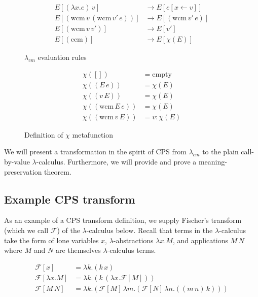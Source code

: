 \documentclass[11pt,ms]{byuprop}
\newcounter{definition}
\newcounter{example}
\begin{document}
\begin{figure}
\begin{align*}
E[(\lambda x.e)\,v]                         &\rightarrow E[e[x\leftarrow v]]\\
E[(\mathrm{wcm}\,v\,(\mathrm{wcm}\,v'\,e))] &\rightarrow E[(\mathrm{wcm}\,v'\,e)]\\
E[(\mathrm{wcm}\,v\,v')]                    &\rightarrow E[v']\\
E[(\mathrm{ccm})]                           &\rightarrow E[\chi(E)]
\end{align*}
\caption{$\lambda_{cm}$ evaluation rules}
\label{language-semantics}
\end{figure}

\begin{figure}
\begin{align*}
\chi([])                   &= \mathrm{empty}\\
\chi((E\,e))               &= \chi(E)\\
\chi((v\,E))               &= \chi(E)\\
\chi((\mathrm{wcm}\,E\,e)) &= \chi(E)\\
\chi((\mathrm{wcm}\,v\,E)) &= v : \chi(E)
\end{align*}
\caption{Definition of $\chi$ metafunction}
\label{chi-metafunction}
\end{figure}

We will present a transformation in the spirit of CPS from $\lambda_{cm}$ to 
the plain call-by-value $\lambda$-calculus. Furthermore, we will provide and 
prove a meaning-preservation theorem.

\subsection{Example CPS transform}

As an example of a CPS transform definition, we supply Fischer's transform 
(which we call $\mathcal{F}$) of the $\lambda$-calculus 
\cite{fischer1972lambda} below. Recall that terms in 
the $\lambda$-calculus take the form of lone variables $x$, 
$\lambda$-abstractions $\lambda x.M$, and applications 
$M\,N$ where $M$ and $N$ are themselves $\lambda$-calculus terms.

\begin{align*}
\mathcal{F}[x]           &= \lambda k.(k\,x)\\
\mathcal{F}[\lambda x.M] &= \lambda k.(k\,(\lambda x.\mathcal{F}[M]))\\
\mathcal{F}[M\,N]        &= \lambda k.(\mathcal{F}[M]\,\lambda m.(\mathcal{F}[N]\,\lambda n.((m\,n)\,k)))
\end{align*}
\end{document}
